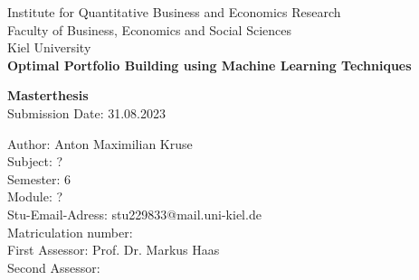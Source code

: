 \documentclass[11pt,a4paper]{article}
\begin{document}
\pagestyle{empty}
	
\begin{titlepage}				
	\begin{center}
Institute for Quantitative Business and Economics Research\\
Faculty of Business, Economics and Social Sciences\\
Kiel University \\
		\vspace{5cm}
		\LARGE{ \bf{Optimal Portfolio Building using Machine Learning Techniques}}
		\vspace{2cm}
		
		\large{\bf{Masterthesis}}\\
		Submission Date: 31.08.2023
		\vspace{1.5cm}

\begin{flushleft}
\vfill
	Author: Anton Maximilian Kruse\\
	Subject: ?\\
	Semester: 6\\
	Module: ?\\
	Stu-Email-Adress: stu229833@mail.uni-kiel.de\\
	Matriculation number: \\
	\vspace{1cm}
	First Assessor: Prof. Dr. Markus Haas\\
	Second Assessor:
\end{flushleft}	
		
				
	\end{center}

\end{titlepage}




\newpage
	\tableofcontents
	\newpage


\pagestyle{fancy}					
\fancyhf{}								
\fancyhead[R]{}							 
\renewcommand{\headrulewidth}{0pt}	 
\fancyfoot[R]{\thepage}				 
\renewcommand{\footrulewidth}{0pt}	 
\setcounter{page}{1}



\listoffigures
\end{document}
